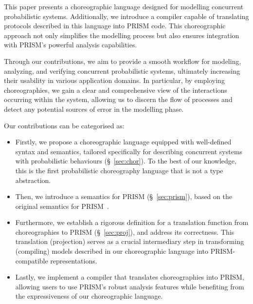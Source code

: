 This paper presents a choreographic language designed for modelling
concurrent probabilistic systems.
Additionally, we introduce a compiler capable of translating protocols
described in this language into PRISM code. This choreographic
approach not only simplifies the modelling process but also ensures
integration with PRISM's powerful analysis capabilities. 




Through our contributions, we aim to provide a smooth workflow for
modeling, analyzing, and verifying concurrent probabilistic systems,
ultimately increasing their usability in various application domains.
%
In particular, by employing choreographies, we gain a clear and
comprehensive view of the interactions occurring within the system,
allowing us to discern the flow of processes and detect any potential
sources of error in the modelling phase.


 Our contributions can be
categorised as:
\begin{itemize} 
\item Firstly, we propose a choreographic language equipped with
  well-defined syntax and semantics, tailored specifically for
  describing concurrent systems with probabilistic behaviours
  (\S~\ref{sec:chor}). To the best of our knowledge, this is the first
  probabilistic choreography language that is not a type abstraction.
\item Then, we introduce a semantics for PRISM (\S~\ref{sec:prism}),
  based on the original semantics for PRISM~\cite{PRISMdoc}.
\item Furthermore, we establish a rigorous definition for a
  translation function from choreographies to PRISM
  (\S~\ref{sec:proj}), and address its correctness. This translation
  (projection) serves as a crucial intermediary step in transforming
  (compiling) models described in our choreographic language into
  PRISM-compatible representations.
\item Lastly, we implement a compiler that translates choreographies
  into PRISM, allowing users to use PRISM's robust analysis features
  while benefiting from the expressiveness of our choreographic
  language.
\end{itemize}



